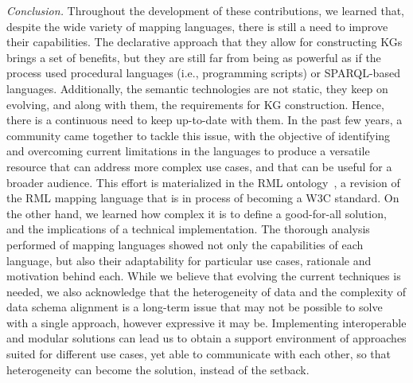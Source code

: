 \begin{itemize}
    \textit{Conclusion.} 
    Throughout the development of these contributions, we learned that, despite the wide variety of mapping languages, there is still a need to improve their capabilities. 
    The declarative approach that they allow for constructing KGs brings a set of benefits, but they are still far from being as powerful as if the process used procedural languages (i.e., programming scripts) or SPARQL-based languages. 
    Additionally, the semantic technologies are not static, they keep on evolving, and along with them, the requirements for KG construction. Hence, there is a continuous need to keep up-to-date with them. 
    In the past few years, a community came together to tackle this issue, with the objective of identifying and overcoming current limitations in the languages to produce a versatile resource that can address more complex use cases, and that can be useful for a broader audience. 
    This effort is materialized in the RML ontology~\parencite{iglesias2023rml}, a revision of the RML mapping language that is in process of becoming a W3C standard. %
    On the other hand, we learned how complex it is to define a good-for-all solution, and the implications of a technical implementation. 
    The thorough analysis performed of mapping languages showed not only the capabilities of each language, but also their adaptability for particular use cases, rationale and motivation behind each. 
    While we believe that evolving the current techniques is needed, we also acknowledge that the heterogeneity of data and the complexity of data schema alignment is a long-term issue that may not be possible to solve with a single approach, however expressive it may be. 
    Implementing interoperable and modular solutions can lead us to obtain a support environment of approaches suited for different use cases, yet able to communicate with each other, so that heterogeneity can become the solution, instead of the setback.
\end{itemize}


